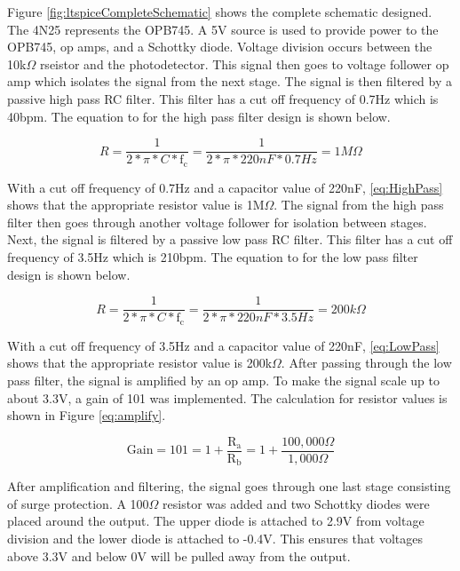 \documentclass[CMPE]{KGCOEReport}
\begin{document}
Figure \ref{fig:ltspiceCompleteSchematic} shows the complete schematic designed. The 4N25 represents the OPB745. A 5V source is used to provide power to the OPB745, op amps, and a Schottky diode. Voltage division occurs between the 10k$\Omega$ rseistor and the photodetector. This signal then goes to voltage follower op amp which isolates the signal from the next stage. The signal is then filtered by a passive high pass RC filter. This filter has a cut off frequency of 0.7Hz which is 40bpm. The equation to for the high pass filter design is shown below.

\begin{equation}
R = \frac{1}{2*\pi*C*\text{f}_\text{c}} = \frac{1}{2*\pi*220nF*0.7Hz} = 1M\Omega \label{eq:HighPass}
\end{equation}

With a cut off frequency of 0.7Hz and a capacitor value of 220nF, \ref{eq:HighPass} shows that the appropriate resistor value is 1M$\Omega$. The signal from the high pass filter then goes through another voltage follower for isolation between stages. Next, the signal is filtered by a passive low pass RC filter. This filter has a cut off frequency of 3.5Hz which is 210bpm.  The equation to for the low pass filter design is shown below.

\begin{equation}
R = \frac{1}{2*\pi*C*\text{f}_\text{c}} = \frac{1}{2*\pi*220nF*3.5Hz} = 200k\Omega \label{eq:LowPass}
\end{equation}

With a cut off frequency of 3.5Hz and a capacitor value of 220nF, \ref{eq:LowPass} shows that the appropriate resistor value is 200k$\Omega$. After passing through the low pass filter, the signal is amplified by an op amp. To make the signal scale up to about 3.3V, a gain of 101 was implemented. The calculation for resistor values is shown in Figure \ref{eq:amplify}. 

\begin{equation}
\text{Gain} = 101 = 1 + \frac{\text{R}_\text{a}}{\text{R}_\text{b}} = 1 + \frac{100,000\Omega}{1,000\Omega} \label{eq:amplify}
\end{equation}

After amplification and filtering, the signal goes through one last stage consisting of surge protection. A 100$\Omega$ resistor was added and two Schottky diodes were placed around the output. The upper diode is attached to 2.9V from voltage division and the lower diode is attached to -0.4V. This ensures that voltages above 3.3V and below 0V will be pulled away from the output. 
\end{document}
